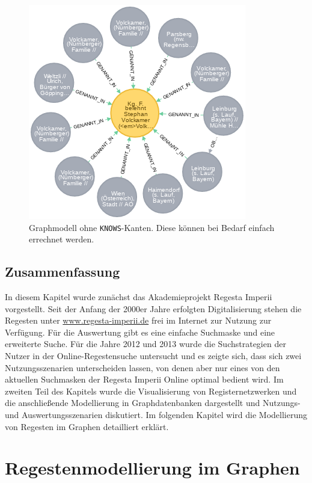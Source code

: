 \documentclass[ngerman,]{scrreprt}
\begin{document}
\begin{figure}
\centering
\includegraphics{Bilder/1zu1-Beziehungen-nur-Regest.png}
\caption{Graphmodell ohne \texttt{KNOWS}-Kanten. Diese können bei Bedarf einfach errechnet werden.}
\end{figure}

\section{Zusammenfassung}\label{zusammenfassung}

In diesem Kapitel wurde zunächst das Akademieprojekt Regesta Imperii vorgestellt. Seit der Anfang der 2000er Jahre erfolgten Digitalisierung stehen die Regesten unter \url{www.regesta-imperii.de} frei im Internet zur Nutzung zur Verfügung. Für die Auswertung gibt es eine einfache Suchmaske und eine erweiterte Suche. Für die Jahre 2012 und 2013 wurde die Suchstrategien der Nutzer in der Online-Regestensuche untersucht und es zeigte sich, dass sich zwei Nutzungsszenarien unterscheiden lassen, von denen aber nur eines von den aktuellen Suchmasken der Regesta Imperii Online optimal bedient wird. Im zweiten Teil des Kapitels wurde die Visualisierung von Registernetzwerken und die anschließende Modellierung in Graphdatenbanken dargestellt und Nutzungs- und Auswertungsszenarien diskutiert. Im folgenden Kapitel wird die Modellierung von Regesten im Graphen detailliert erklärt.

\chapter{Regestenmodellierung im Graphen}\label{regestenmodellierung-im-graphen}
\end{document}
